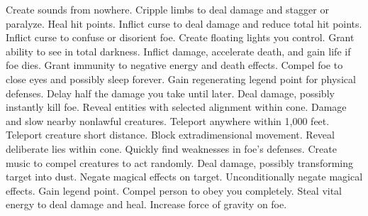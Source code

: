     {Create sounds from nowhere.}
    {Cripple limbs to deal damage and stagger or paralyze.}
    {Heal hit points.}
    {Inflict curse to deal damage and reduce total hit points.}
    {Inflict curse to confuse or disorient foe.}
    {Create floating lights you control.}
    {Grant ability to see in total darkness.}
    {Inflict damage, accelerate death, and gain life if foe dies.}
    {Grant immunity to negative energy and death effects.}
    {Compel foe to close eyes and possibly sleep forever.}
    {Gain regenerating legend point for physical defenses.}
    {Delay half the damage you take until later.}
    {Deal damage, possibly instantly kill foe.}
    {Reveal entities with selected alignment within cone.}
    {Damage and slow nearby nonlawful creatures.}
    {Teleport anywhere within 1,000 feet.}
    {Teleport creature short distance.}
    {Block extradimensional movement.}
    {Reveal deliberate lies within cone.}
    {Quickly find weaknesses in foe's defenses.}
    {Create music to compel creatures to act randomly.}
    {Deal damage, possibly transforming target into dust.}
    {Negate magical effects on target.}
    {Unconditionally negate magical effects.}
    {Gain legend point.}
    {Compel person to obey you completely.}
    {Steal vital energy to deal damage and heal.}
    {Increase force of gravity on foe.}
